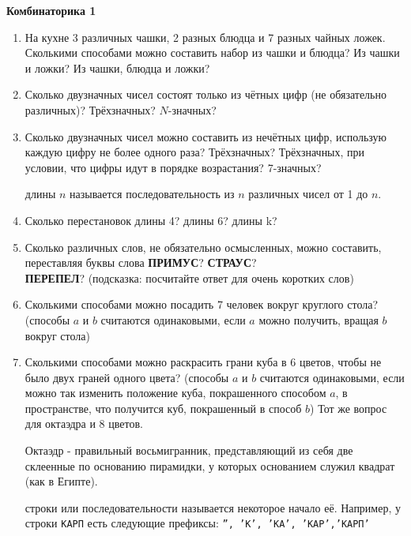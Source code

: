 \centerline{\bf Комбинаторика 1}
\begin{enumerate}
\item На кухне 3 различных чашки, 2 разных блюдца и 7 разных чайных ложек. Сколькими способами можно
составить набор из чашки и блюдца? Из чашки и ложки? Из чашки, блюдца и ложки?
\item Сколько двузначных чисел состоят только из чётных цифр (не обязательно различных)?
Трёхзначных? $N$-значных?
\item Сколько двузначных чисел можно составить из нечётных цифр, использую каждую цифру не более
одного раза? Трёхзначных? Трёхзначных, при условии, что цифры идут в порядке возрастания? 7-значных?

 длины $n$ называется последовательность из $n$
различных чисел от 1 до $n$.
\item Сколько перестановок длины 4? длины 6? длины k?
\item Сколько различных слов, не обязательно осмысленных, можно составить, переставляя буквы слова
    {\bf ПРИМУС}? {\bf СТРАУС}? \\{\bf ПЕРЕПЕЛ}? {\small (подсказка: посчитайте ответ для очень
        коротких слов)}
\item Сколькими способами можно посадить 7 человек вокруг круглого стола? (способы $a$ и $b$ считаются
    одинаковыми, если $a$ можно получить, вращая $b$ вокруг стола)
\item Сколькими способами можно раскрасить грани куба в 6 цветов, чтобы не было двух граней одного
    цвета? (способы $a$ и $b$ считаются одинаковыми, если можно так изменить положение куба, покрашенного
        способом $a$, в пространстве, что получится куб, покрашенный в способ $b$) Тот же вопрос для
        октаэдра и 8 цветов.

        Октаэдр - правильный восьмигранник, представляющий из себя
        две склеенные по основанию пирамидки, у которых основанием служил квадрат (как в Египте).

 строки или последовательности называется некоторое начало
        её. Например, у строки {\tt КАРП} есть следующие префиксы: {\tt '', 'К', 'КА', 'КАР','КАРП'}
\end{enumerate}
